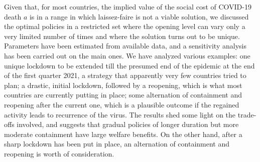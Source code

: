\documentclass{amsart}
\begin{document}
\color{black}


\medskip

Given that, for most countries,  the
implied value of the social cost of COVID-19 death $a$
is in a range in which laissez-faire is not a viable solution, we discussed the optimal policies in a restricted set where the opening level can vary only a very limited number of times and where the solution  turns out to be unique. \color{black} 
Parameters have been estimated from available data, and
a sensitivity analysis has been carried out on the main ones.
 We have analyzed various examples: one unique lockdown
 to be extended till the presumed end of the 
epidemic at the end of the first quarter 2021,
a strategy that apparently very few countries tried to plan; 
 a drastic, initial lockdown, followed by 
 a reopening, which is what most countries
 are currently putting in place;
 some alternation of containment and reopening
 after the current one, 
 which is a plausible outcome if the
regained activity leads to recurrence of the virus.
The results  shed some light on the trade-offs involved, and suggests that gradual policies of longer duration but more moderate containment have large welfare benefits.
On the other hand, after a sharp lockdown has been put
in place, an alternation of containment and
reopening is worth of consideration.
\color{black}
\end{document}
